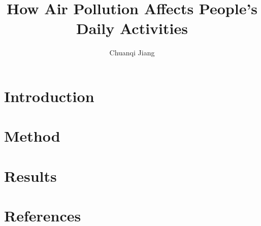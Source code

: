 \documentclass[a4paper,man,natbib,floatsintext]{apa6}
\title{How Air Pollution Affects People's Daily Activities}
\author{Chuanqi Jiang}
\affiliation{Tsinghua University}
\begin{document}
\renewcommand{\raggedright}{\leftskip=0pt \rightskip=0pt plus 0cm}
\maketitle

\section{Introduction}


\section{Method}

\newpage
\section{Results}


\newpage
\section{References}










%
\end{document}
